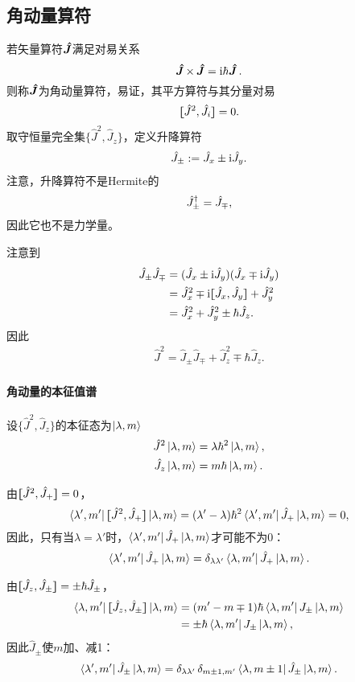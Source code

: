 \subsection{角动量算符}
若矢量算符$\qo J$满足对易关系
\[\qo J\times\,\qo J=\i\hbar\qo J.\]
则称$\qo J$为角动量算符，易证，其平方算符与其分量对易
\[\cmm {J^2}{J_i}=0.\]
取守恒量完全集$\{\hat J^2,\hat J_z\}$，定义升降算符
\begin{align}
	\hat J_\pm:=\hat J_x\pm\i\hat J_y.
\end{align}
注意，升降算符不是Hermite的
\[\hat J_\pm\dg=\hat J_\mp,\]
因此它也不是力学量。

注意到
\begin{align*}
	\hat J_\pm\hat J_\mp&=(\hat J_x\pm\i\hat J_y)(\hat J_x\mp\i\hat J_y)\\
	&=\hat J_x^2\mp\i\cmm{J_x}{J_y}+\hat J_y^2\\
	&=\hat J_x^2+\hat J_y^2\pm\hbar\hat J_z.
\end{align*}
因此 
\begin{align}
	\hat J^2=\hat J_\pm\hat J_\mp+\hat J_z^2\mp\hbar\hat J_z.
\end{align}
\paragraph*{角动量的本征值谱}设$\{\hat J^2,\hat J_z\}$的本征态为$\ket{\lambda,m}$
\begin{align*}
	\hat J^2\ket{\lambda,m}&=\lambda\hbar^2\ket{\lambda,m},\\
	\hat J_z\ket{\lambda,m}&=m\hbar\ket{\lambda,m}.
\end{align*}

由$\cmm{J^2}{J_+}=0$，
\[\bra{\lambda',m'}\cmm{J^2}{J_+}\ket{\lambda,m}=(\lambda'-\lambda)\hbar^2\bra{\lambda',m'}\hat J_+\ket{\lambda,m}=0,\]
因此，只有当$\lambda=\lambda'$时，$\bra{\lambda',m'}\hat J_+\ket{\lambda,m}$才可能不为0：
\begin{align}
	\bra{\lambda',m'}\hat J_+\ket{\lambda,m}=\vd_{\lambda\lambda'}\bra{\lambda,m'}\hat J_+\ket{\lambda,m}.
\end{align}

由$\cmm{J_z}{J_\pm}=\pm\hbar\hat J_\pm$，
\begin{align*}
	\bra{\lambda,m'}\cmm{J_z}{J_\pm}\ket{\lambda,m}&=(m'-m\mp 1)\hbar\bra{\lambda,m'}J_\pm\ket{\lambda,m}\\
	&=\pm\hbar\bra{\lambda,m'}J_\pm\ket{\lambda,m},
\end{align*}
因此$\hat J_\pm$使$m$加、减1：
\begin{align}
	\bra{\lambda',m'}\hat J_\pm\ket{\lambda,m}=\vd_{\lambda\lambda'}\vd_{m\pm 1,m'}\bra{\lambda,m\pm 1}\hat J_\pm\ket{\lambda,m}.
\end{align}

